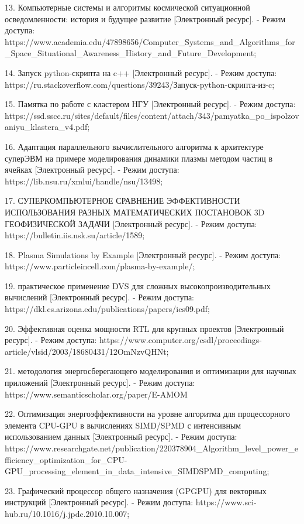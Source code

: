 \documentclass{article}
\begin{document}
13. Компьютерные системы и алгоритмы космической ситуационной осведомленности: история и будущее развитие [Электронный ресурс].
   - Режим доступа: https://www.academia.edu/47898656/Computer_Systems_and_Algorithms_for_Space_Situational_Awareness_History_and_Future_Development;

14. Запуск python-скрипта на c++ [Электронный ресурс].
   - Режим доступа: https://ru.stackoverflow.com/questions/39243/Запуск-python-скрипта-из-c;

15. Памятка по работе с кластером НГУ [Электронный ресурс].
   - Режим доступа: https://ssd.sscc.ru/sites/default/files/content/attach/343/pamyatka_po_ispolzovaniyu_klastera_v4.pdf;

16. Адаптация параллельного вычислительного алгоритма к архитектуре суперЭВМ на примере моделирования динамики плазмы методом частиц в ячейках [Электронный ресурс].
   - Режим доступа: https://lib.nsu.ru/xmlui/handle/nsu/13498;

17. СУПЕРКОМПЬЮТЕРНОЕ СРАВНЕНИЕ ЭФФЕКТИВНОСТИ ИСПОЛЬЗОВАНИЯ РАЗНЫХ МАТЕМАТИЧЕСКИХ ПОСТАНОВОК 3D ГЕОФИЗИЧЕСКОЙ ЗАДАЧИ [Электронный ресурс].
   - Режим доступа: https://bulletin.iis.nsk.su/article/1589;

18. Plasma Simulations by Example [Электронный ресурс].
   - Режим доступа: https://www.particleincell.com/plasma-by-example/;

19. практическое применение DVS для сложных высокопроизводительных вычислений [Электронный ресурс].
   - Режим доступа: https://dkl.cs.arizona.edu/publications/papers/ics09.pdf;

20. Эффективная оценка мощности RTL для крупных проектов [Электронный ресурс].
   - Режим доступа: https://www.computer.org/csdl/proceedings-article/vlsid/2003/18680431/12OmNzvQHNt;

21. методология энергосберегающего моделирования и оптимизации для научных приложений [Электронный ресурс].
   - Режим доступа: https://www.semanticscholar.org/paper/E-AMOM%

22. Оптимизация энергоэффективности на уровне алгоритма для процессорного элемента CPU-GPU в вычислениях SIMD/SPMD с интенсивным использованием данных [Электронный ресурс].
   - Режим доступа: https://www.researchgate.net/publication/220378904_Algorithm_level_power_efficiency_optimization_for_CPU-GPU_processing_element_in_data_intensive_SIMDSPMD_computing;

23. Графический процессор общего назначения (GPGPU) для векторных инструкций [Электронный ресурс].
   - Режим доступа: https://www.sci-hub.ru/10.1016/j.jpdc.2010.10.007;
\end{document}
